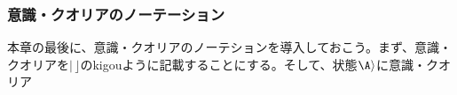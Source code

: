 \subsubsection{意識・クオリアのノーテーション}
本章の最後に、意識・クオリアのノーテションを導入しておこう。まず、意識・クオリアを$|\,\rfloor$のkigouように記載することにする。そして、状態$\A\rangle$に意識・クオリア
